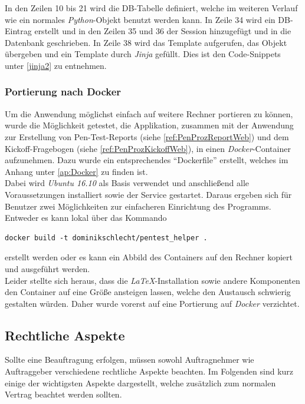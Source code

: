 In den Zeilen 10 bis 21 wird die DB-Tabelle definiert, welche im weiteren Verlauf wie ein normales \textit{Python}-Objekt benutzt werden kann. In Zeile 34 wird ein DB-Eintrag erstellt und in den Zeilen 35 und 36 der Session hinzugefügt und in die Datenbank geschrieben. In Zeile 38 wird das Template aufgerufen, das Objekt übergeben und ein Template durch \textit{Jinja} gefüllt. Dies ist den Code-Snippets unter \ref{jinja2} zu entnehmen.

\subsubsection{Portierung nach Docker}\label{ref:PenProzPortDocker}
Um die Anwendung möglichst einfach auf weitere Rechner portieren zu können, wurde die Möglichkeit getestet, die Applikation, zusammen mit der Anwendung zur Erstellung von Pen-Test-Reports (siehe \ref{ref:PenProzReportWeb}) und dem Kickoff-Fragebogen (siehe \ref{ref:PenProzKickoffWeb}), in einen \textit{Docker}-Container aufzunehmen. Dazu wurde ein entsprechendes "`Dockerfile"' erstellt, welches im Anhang unter \ref{ap:Docker} zu finden ist.\\

Dabei wird \textit{Ubuntu 16.10} als Basis verwendet und anschließend alle Voraussetzungen installiert sowie der Service gestartet. Daraus ergeben sich für Benutzer zwei Möglichkeiten zur einfacheren Einrichtung des Programms. Entweder es kann lokal über das Kommando
\begin{lstlisting}
docker build -t dominikschlecht/pentest_helper .
\end{lstlisting}
erstellt werden oder es kann ein Abbild des Containers auf den Rechner kopiert und ausgeführt werden.\\

Leider stellte sich heraus, dass die \textit{LaTeX}-Installation sowie andere Komponenten den Container auf eine Größe ansteigen lassen, welche den Austausch schwierig gestalten würden. Daher wurde vorerst auf eine Portierung auf \textit{Docker} verzichtet.

	\subsection{Rechtliche Aspekte}
	Sollte eine Beauftragung erfolgen, müssen sowohl Auftragnehmer wie Auftraggeber verschiedene rechtliche Aspekte beachten. Im Folgenden sind kurz einige der wichtigsten Aspekte dargestellt, welche zusätzlich zum normalen Vertrag beachtet werden sollten.\\
	
